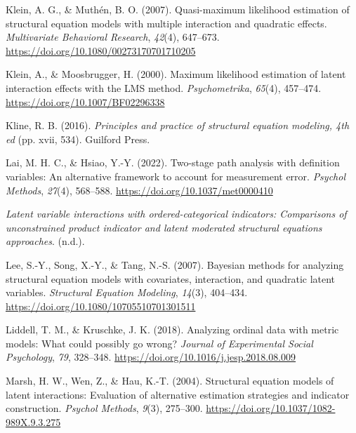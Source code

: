 \documentclass[
  11pt,
  man]{apa6}
\newlength{\cslhangindent}
\newlength{\cslentryspacingunit} %
\newenvironment{CSLReferences}[2] %
 {%
  \setlength{\parindent}{0pt}
  \ifodd #1
  \let\oldpar\par
  \def\par{\hangindent=\cslhangindent\oldpar}
  \fi
  \setlength{\parskip}{#2\cslentryspacingunit}
 }%
 {}
\begin{document}
\begin{CSLReferences}{1}{0}
\leavevmode{}%
Klein, A. G., \& Muthén, B. O. (2007). Quasi-maximum likelihood estimation of structural equation models with multiple interaction and quadratic effects. \emph{Multivariate Behavioral Research}, \emph{42}(4), 647--673. \url{https://doi.org/10.1080/00273170701710205}

\leavevmode{}%
Klein, A., \& Moosbrugger, H. (2000). Maximum likelihood estimation of latent interaction effects with the {LMS} method. \emph{Psychometrika}, \emph{65}(4), 457--474. \url{https://doi.org/10.1007/BF02296338}

\leavevmode{}%
Kline, R. B. (2016). \emph{Principles and practice of structural equation modeling, 4th ed} (pp. xvii, 534). Guilford Press.

\leavevmode{}%
Lai, M. H. C., \& Hsiao, Y.-Y. (2022). Two-stage path analysis with definition variables: {An} alternative framework to account for measurement error. \emph{Psychol Methods}, \emph{27}(4), 568--588. \url{https://doi.org/10.1037/met0000410}

\leavevmode{}%
\emph{Latent {variable interactions with ordered-categorical indicators}: {Comparisons} of {unconstrained product indicator} and {latent moderated structural equations approaches}}. (n.d.).

\leavevmode{}%
Lee, S.-Y., Song, X.-Y., \& Tang, N.-S. (2007). Bayesian methods for analyzing structural equation models with covariates, interaction, and quadratic latent variables. \emph{Structural Equation Modeling}, \emph{14}(3), 404--434. \url{https://doi.org/10.1080/10705510701301511}

\leavevmode{}%
Liddell, T. M., \& Kruschke, J. K. (2018). Analyzing ordinal data with metric models: {What} could possibly go wrong? \emph{Journal of Experimental Social Psychology}, \emph{79}, 328--348. \url{https://doi.org/10.1016/j.jesp.2018.08.009}

\leavevmode{}%
Marsh, H. W., Wen, Z., \& Hau, K.-T. (2004). Structural equation models of latent interactions: Evaluation of alternative estimation strategies and indicator construction. \emph{Psychol Methods}, \emph{9}(3), 275--300. \url{https://doi.org/10.1037/1082-989X.9.3.275}


\end{CSLReferences}
\end{document}

